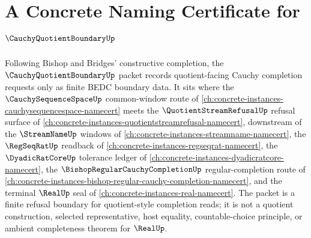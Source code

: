 \chapter{A Concrete Naming Certificate for $\CauchyQuotientBoundaryUp$}
\label{ch:concrete-instances-cauchy-quotient-boundary-namecert}

Following Bishop and Bridges' constructive completion, the $\CauchyQuotientBoundaryUp$ packet records quotient-facing Cauchy completion requests only as finite BEDC boundary data. It sits where the $\CauchySequenceSpaceUp$ common-window route of \autoref{ch:concrete-instances-cauchysequencespace-namecert} meets the $\QuotientStreamRefusalUp$ refusal surface of \autoref{ch:concrete-instances-quotientstreamrefusal-namecert}, downstream of the $\StreamNameUp$ windows of \autoref{ch:concrete-instances-streamname-namecert}, the $\RegSeqRatUp$ readback of \autoref{ch:concrete-instances-regseqrat-namecert}, the $\DyadicRatCoreUp$ tolerance ledger of \autoref{ch:concrete-instances-dyadicratcore-namecert}, the $\BishopRegularCauchyCompletionUp$ regular-completion route of \autoref{ch:concrete-instances-bishop-regular-cauchy-completion-namecert}, and the terminal $\RealUp$ seal of \autoref{ch:concrete-instances-real-namecert}. The packet is a finite refusal boundary for quotient-style completion reads; it is not a quotient construction, selected representative, host equality, countable-choice principle, or ambient completeness theorem for $\RealUp$.

